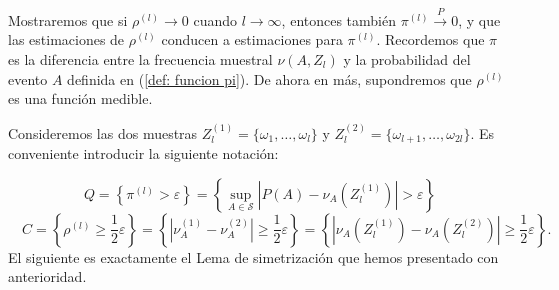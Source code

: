 \documentclass{report}
\begin{document}
Mostraremos que si \( \rho^{(l)} \to 0 \) cuando \( l \to \infty \), entonces también \( \pi^{(l)} \xrightarrow{P} 0 \), 
y que las estimaciones de \( \rho^{(l)}\) conducen a estimaciones para \( \pi^{(l)} \). Recordemos que $\pi$ es la diferencia
entre la frecuencia muestral $\nu(A,Z_l)$ y la probabilidad del evento $A$ definida en (\ref{def: funcion pi}).
De ahora en más, supondremos que \( \rho^{(l)} \) es una función medible.\newline

Consideremos las dos muestras $Z^{(1)}_l = \{\omega_1,\dots, \omega_l\}$ y $Z^{(2)}_l = \{\omega_{l+1},\dots, \omega_{2l}\}$.
Es conveniente introducir la siguiente notación:

\[
Q = \left\{ \pi^{(l)} > \varepsilon \right\} = \left\{ \sup_{A\in\mathcal{S}} |P(A)-\nu_A\left(Z^{(1)}_l\right)| > \varepsilon\right\}
\]
\[
\quad C = \left\{ \rho^{(l)} \geq \frac{1}{2}\varepsilon \right\} = \left\{ |\nu_A^{(1)} - \nu_A^{(2)}| \geq \frac{1}{2} \varepsilon\right\}
= \left\{ |\nu_A\left(Z^{(1)}_l\right) - \nu_A\left(Z^{(2)}_l\right)| \geq \frac{1}{2} \varepsilon\right\}.
\]
\bigbreak
El siguiente es exactamente el Lema de simetrización que hemos presentado con anterioridad.\newline
\end{document}
